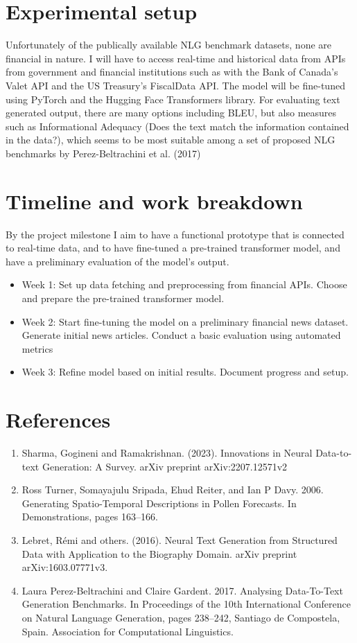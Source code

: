 \documentclass[11pt]{article}
\begin{document}
\section{Experimental setup}
Unfortunately of the publically available NLG benchmark datasets, none are financial in nature. I will have to access real-time and historical data from APIs from government and financial institutions such as with the Bank of Canada's Valet API and the US Treasury's FiscalData API. The model will be fine-tuned using PyTorch and the Hugging Face Transformers library. For evaluating text generated output, there are many options including BLEU, but also measures such as Informational Adequacy (Does the text match the information contained in the data?), which seems to be most suitable among a set of proposed NLG benchmarks by Perez-Beltrachini et al. (2017)

\section{Timeline and work breakdown}
By the project milestone I aim to have a functional prototype that is connected to real-time data, and to have fine-tuned a pre-trained transformer model, and have a preliminary evaluation of the model's output. 
\begin{itemize}
    \item Week 1: Set up data fetching and preprocessing from financial APIs. Choose and prepare the pre-trained transformer model.
    \item Week 2: Start fine-tuning the model on a preliminary financial news dataset. Generate initial news articles. Conduct a basic evaluation using automated metrics
    \item Week 3: Refine model based on initial results. Document progress and setup.
\end{itemize}

\section{References}

\begin{enumerate}
    \item Sharma, Gogineni and Ramakrishnan. (2023). Innovations in Neural Data-to-text Generation: A Survey. arXiv preprint arXiv:2207.12571v2
    \item Ross Turner, Somayajulu Sripada, Ehud Reiter, and Ian P Davy. 2006. Generating Spatio-Temporal Descriptions in Pollen Forecasts. In Demonstrations, pages 163–166.
    \item Lebret, Rémi and others. (2016). Neural Text Generation from Structured Data with Application to the Biography Domain. arXiv preprint arXiv:1603.07771v3.
    \item Laura Perez-Beltrachini and Claire Gardent. 2017. Analysing Data-To-Text Generation Benchmarks. In Proceedings of the 10th International Conference on Natural Language Generation, pages 238–242, Santiago de Compostela, Spain. Association for Computational Linguistics.
\end{enumerate}
\end{document}
